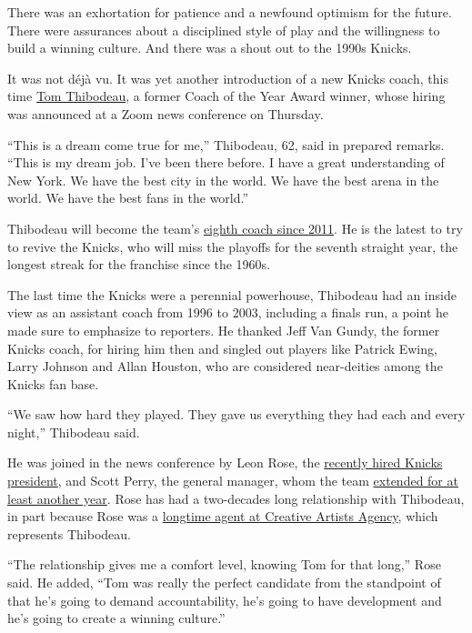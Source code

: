 There was an exhortation for patience and a newfound optimism for the
future. There were assurances about a disciplined style of play and the
willingness to build a winning culture. And there was a shout out to the
1990s Knicks.

It was not déjà vu. It was yet another introduction of a new Knicks
coach, this time
\href{https://www.nytimes.com/2020/07/25/sports/tom-thibodeau-nearing-agreement-to-become-knicks-coach.html}{Tom
Thibodeau}, a former Coach of the Year Award winner, whose hiring was
announced at a Zoom news conference on Thursday.

``This is a dream come true for me,'' Thibodeau, 62, said in prepared
remarks. ``This is my dream job. I've been there before. I have a great
understanding of New York. We have the best city in the world. We have
the best arena in the world. We have the best fans in the world.''

Thibodeau will become the team's
\href{https://www.basketball-reference.com/teams/NYK/}{eighth coach
since 2011}. He is the latest to try to revive the Knicks, who will miss
the playoffs for the seventh straight year, the longest streak for the
franchise since the 1960s.

The last time the Knicks were a perennial powerhouse, Thibodeau had an
inside view as an assistant coach from 1996 to 2003, including a finals
run, a point he made sure to emphasize to reporters. He thanked Jeff Van
Gundy, the former Knicks coach, for hiring him then and singled out
players like Patrick Ewing, Larry Johnson and Allan Houston, who are
considered near-deities among the Knicks fan base.

``We saw how hard they played. They gave us everything they had each and
every night,'' Thibodeau said.

He was joined in the news conference by Leon Rose, the
\href{https://www.nytimes.com/2020/02/06/sports/basketball/leon-rose-knicks-president.html}{recently
hired Knicks president}, and Scott Perry, the general manager, whom the
team
\href{https://www.nytimes.com/2020/04/29/sports/basketball/scott-perry-knicks.html}{extended
for at least another year}. Rose has had a two-decades long relationship
with Thibodeau, in part because Rose was a
\href{https://www.nytimes.com/2020/06/24/sports/basketball/knicks-world-wide-wes.html}{longtime
agent at Creative Artists Agency}, which represents Thibodeau.

``The relationship gives me a comfort level, knowing Tom for that
long,'' Rose said. He added, ``Tom was really the perfect candidate from
the standpoint of that he's going to demand accountability, he's going
to have development and he's going to create a winning culture.''

